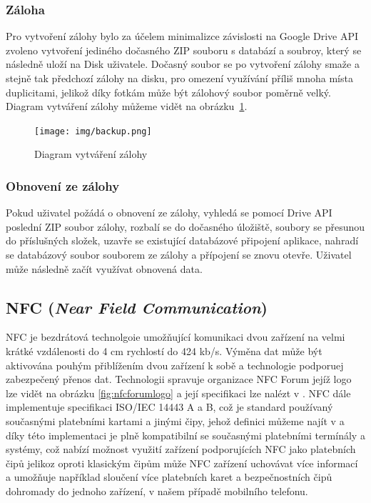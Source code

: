 \documentclass{article}
\begin{document}
\subsubsection{Záloha}
Pro vytvoření zálohy bylo za účelem minimalizce závislosti na Google Drive API zvoleno vytvoření jediného
dočasného ZIP souboru s databází a soubroy, který se následně uloží na Disk uživatele. Dočasný soubor se po
vytvoření zálohy smaže a stejně tak předchozí zálohy na disku, pro omezení využívání příliš mnoha místa duplicitami,
jelikož díky fotkám může být zálohový soubor poměrně velký. Diagram vytváření zálohy můžeme vidět na obrázku~\ref{fig:backup}.

\begin{figure}[H]
        \centering
                \texttt{[image: img/backup.png]}
        \caption{Diagram vytváření zálohy}
        \label{fig:backup}
\end{figure}

\subsubsection{Obnovení ze zálohy}
Pokud uživatel požádá o obnovení ze zálohy, vyhledá se pomocí Drive API poslední ZIP soubor zálohy,
rozbalí se do dočasného úložiště, soubory se přesunou do příslušných složek, uzavře se existující
databázové připojení aplikace, nahradí se databázový soubor souborem ze zálohy a přípojení se znovu otevře.
Uživatel může následně začít využívat obnovená data.

\subsection{NFC (\textit{Near Field Communication})}
NFC je bezdrátová technolgoie umožňující komunikaci dvou zařízení na velmi krátké vzdálenosti do 4 cm
rychlostí do 424 kb/s.\cite{nfcforum}  Výměna dat může být aktivována pouhým přiblížením dvou zařízení k sobě
a technologie podporuej zabezpečený přenos dat. Technologii spravuje organizace NFC Forum jejíž logo lze vidět
na obrázku \ref{fig:nfcforumlogo} a její specifikaci lze nalézt v \cite{nfciso}.
NFC dále implementuje specifikaci ISO/IEC 14443 A a B\cite{nfcforum}, což je standard používaný
současnými platebními kartami a jinými čipy, jehož definici můžeme najít v \cite{rfidiso} a díky této
implementaci je plně kompatibilní se současnými platebními termínály a systémy, což nabízí možnost využití zařízení
podporujících NFC jako platebních čipů jelikoz oproti klasickým čipům může NFC zařízení uchovávat více informací
a umožňuje například sloučení více platebních karet a bezpečnostních čipů dohromady do jednoho zařízení,
v našem případě mobilního telefonu.
\end{document}

